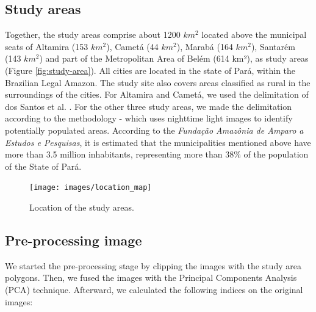 \documentclass[preprint, 3p,
authoryear]{elsarticle} %
\begin{document}
\hypertarget{study-areas}{%
\subsection{Study areas}\label{study-areas}}

Together, the study areas comprise about 1200 \(km^2\) located above the
municipal seats of Altamira (153 \(km^2\)), Cametá (44 \(km^2\)), Marabá
(164 \(km^2\)), Santarém (143 \(km^2\)) and part of the Metropolitan
Area of Belém (614 km²), as study areas (Figure \ref{fig:study-area}).
All cities are located in the state of Pará, within the Brazilian Legal
Amazon. The study site also covers areas classified as rural in the
surroundings of the cities. For Altamira and Cametá, we used the
delimitation of dos Santos et al. \citeyearpar{Santos2022}. For the
other three study areas, we made the delimitation according to the
methodology \citep{Goncalves2021} - which uses nighttime light images to
identify potentially populated areas. According to the \emph{Fundação
Amazônia de Amparo a Estudos e Pesquisas}, it is estimated that the
municipalities mentioned above have more than 3.5 million inhabitants,
representing more than 38\% of the population of the State of Pará.

\begin{figure}
\texttt{[image: images/location\_map]} \caption{\label{fig:study-area}Location of the study areas.}\label{fig:fig-1}
\end{figure}

\hypertarget{pre-processing-image}{%
\subsection{Pre-processing image}\label{pre-processing-image}}

We started the pre-processing stage by clipping the images with the
study area polygons. Then, we fused the images with the Principal
Components Analysis (PCA) technique. Afterward, we calculated the
following indices on the original images:
\end{document}
